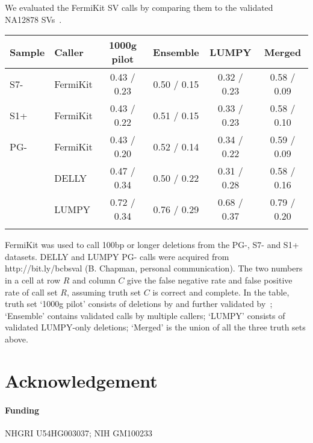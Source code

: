 \documentclass{bioinfo}
\begin{document}
We evaluated the FermiKit SV calls by comparing them to the validated NA12878
SVs~\citep{Layer:2014aa}.

\begin{table}[htb]
{\footnotesize
\begin{tabular}{llcccc}
\toprule
Sample& Caller  & {1000g pilot} & {Ensemble} & {LUMPY} & {Merged}\\
\midrule
S7- & FermiKit  & 0.43 / 0.23 & 0.50 / 0.15 & 0.32 / 0.23 & 0.58 / 0.09 \\
S1+ & FermiKit  & 0.43 / 0.22 & 0.51 / 0.15 & 0.33 / 0.23 & 0.58 / 0.10 \\
PG- & FermiKit  & 0.43 / 0.20 & 0.52 / 0.14 & 0.34 / 0.22 & 0.59 / 0.09\\
    & DELLY     & 0.47 / 0.34 & 0.50 / 0.22 & 0.31 / 0.28 & 0.58 / 0.16\\
    & LUMPY     & 0.72 / 0.34 & 0.76 / 0.29 & 0.68 / 0.37 & 0.79 / 0.20\\
\botrule
\end{tabular}}{FermiKit was used to call 100bp or longer deletions from the
PG-, S7- and S1+ datasets.  DELLY and LUMPY PG- calls were acquired from
http://bit.ly/bcbsval (B. Chapman, personal communication). The two numbers in
a cell at row $R$ and column $C$ give the false negative rate and false
positive rate of call set $R$, assuming truth set $C$ is correct and complete.
In the table, truth set `1000g pilot' consists of deletions by
\citet{Mills:2011aa} and further validated by~\citet{Layer:2014aa};
`Ensemble' contains validated calls by multiple callers; `LUMPY'
consists of validated LUMPY-only deletions; `Merged' is the union of all the
three truth sets above.}

\end{table}

\section*{Acknowledgement}
\paragraph{Funding\textcolon} NHGRI U54HG003037; NIH GM100233


\end{document}
